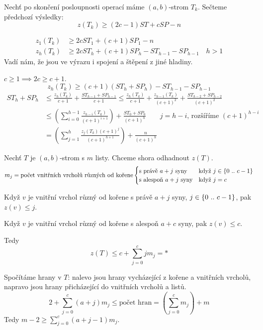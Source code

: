 Nechť po skončení posloupnosti operací máme $(a,b)$-strom $T_k$.
Sečteme předchozí výsledky:
\begin{equation}
\label{eq:ab-secti}
  z(T_k) \geq (2c - 1)ST + c SP - n  
\end{equation}

\begin{align}
  z_1(T_k)      & \geq 2c ST_1 + (c+1) SP_1 - n\\
  z_h(T_k)      & \geq 2c ST_h + (c+1) SP_h - ST_{h-1} - SP_{h-1} \quad h>1
\end{align}
Vadí nám, že jsou ve výrazu i spojení a štěpení z jiné hladiny.

$c \geq 1 \implies 2c \geq c+1$.
\[
  z_h(T_k) \geq (c+1) (ST_h + SP_h) - ST_{h-1} - SP_{h-1}
\]
\begin{align}
  ST_h + SP_h 
&  \leq \frac{z_h(T_k)}{c+1} + \frac{ST_{h-1} + SP_{h-1}}{c+1}
  \leq \frac{z_h(T_k)}{c+1} + 
         \frac{z_{h-1}(T_k)}{(c+1)^2} + 
         \frac{ST_{h-2} + SP_{h-2}}{(c+1)^2}\\
&  \leq \left( \sum_{i=0}^{h-1} \frac{z_{h-i}(T_k)}{(c+1)^{i+1}} \right) + 
         \frac{ST_0 + SP_0}{(c+1)^h}
                \qquad\text{$j=h-i$, rozšíříme $(c+1)^{h-i}$}\\
\label{ab-sthsph}
&  = \left( \sum_{j=1}^h \frac{z_j(T_k)(c+1)^j}{(c+1)^{h+1}} \right) + 
         \frac{n}{(c+1)^h}
\end{align}

Nechť $T$ je $(a,b)$-strom s $m$ listy. Chceme shora odhadnout $z(T)$.
\begin{equation}
  m_j = \text{počet vnitřních vrcholů různých od kořene}
  \begin{cases}
    \text{s právě $a+j$ syny}   & \text{když}\ j \in\{{0}\ ..\ {c-1}\}\\
    \text{s alespoň $a+j$ syny} & \text{když}\ j = c
  \end{cases}
\end{equation}

Když $v$ je vnitřní vrchol různý od kořene s právě $a+j$ syny,
$j \in\{{0}\ ..\ {c-1}\}$,
pak $z(v) \leq j$.

Když $v$ je vnitřní vrchol různý od kořene s alespoň $a+c$ syny,
pak $z(v) \leq c$.

Tedy
\begin{equation}
  \label{eq:ab-mj}
  z(T) \leq c + \sum_{j=0}^c j m_j = *
\end{equation}

Spočítáme hrany v $T$: nalevo jsou hrany vycházející z kořene a
vnitřních vrcholů, napravo jsou hrany přicházející do vnitřních
vrcholů a listů.
\begin{equation}
2 + \sum_{j=0}^c (a+j) m_j \leq
\text{počet hran}
= \left( \sum_{j=0}^c m_j \right) + m
\end{equation}
Tedy $m-2 \geq \sum_{j=0}^c (a+j-1) m_j$.

